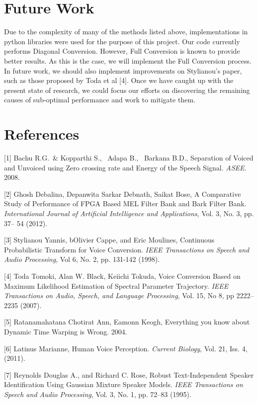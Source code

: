 \documentclass{article}
\begin{document}
\section{Future Work}
 Due to the complexity of many of the methods listed above, implementations in python libraries were used for the purpose of this project. Our code currently performs Diagonal Conversion. However, Full Conversion is known to provide better results. As this is the case, we will implement the Full Conversion process.
In future work, we should also implement improvements on Stylianou's paper, such as those proposed by Toda et al [4]. Once we have caught up with the present state of research, we could focus our efforts on discovering the remaining causes of sub-optimal performance and work to mitigate them. 

\section*{References}

\small

[1] Bachu R.G.\ \& Kopparthi S., \ Adapa B., \ Barkana B.D., Separation of Voiced and Unvoiced using Zero crossing rate and Energy of the Speech Signal.  {\it ASEE}. 2008. 
 
[2] Ghosh Debalina,  Depanwita Sarkar Debnath, Saikat Bose, A Comparative Study of Performance of FPGA Based MEL Filter Bank and Bark Filter Bank. {\it International Journal of Artificial Intelligence and Applications}, Vol. 3, No. 3, pp. 37-- 54 (2012). 
 
[3] Stylianou  Yannis,  bOlivier Cappe, and Eric Moulines, Continuous Probabilistic Transform for Voice Conversion. {\it IEEE Transactions on Speech and Audio Processing}, Vol 6, No. 2, pp. 131-142 (1998). 
 
[4] Toda Tomoki, Alan W. Black, Keiichi Tokuda, Voice Conversion Based on Maximum Likelihood Estimation of Spectral Parameter Trajectory. {\it IEEE Transactions on Audio, Speech, and Language Processing}, Vol. 15, No 8, pp 2222--2235 (2007). 
 
[5] Ratanamahatana Chotirat Ann, Eamonn Keogh, Everything you know about Dynamic Time Warping is Wrong. 2004. 
 
[6] Latinus Marianne, Human Voice Perception. {\it Current Biology}, Vol. 21, Iss. 4, (2011). 
 
[7] Reynolds Douglas A., and Richard C. Rose, Robust Text-Independent Speaker Identification Using Gaussian Mixture Speaker Models. {\it IEEE Transactions on Speech and Audio Processing}, Vol. 3, No. 1, pp. 72--83 (1995).
\end{document}
